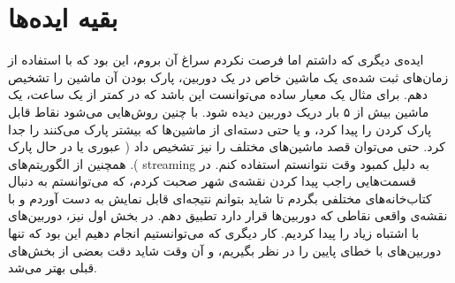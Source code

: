 \section{بقیه ایده‌ها}

ایده‌ی دیگری که داشتم اما فرصت نکردم سراغ آن بروم، این بود که با استفاده از زمان‌های ثبت شده‌ی یک ماشین خاص در یک دوربین، 
پارک بودن آن ماشین را تشخیص دهم. برای مثال یک معیار ساده می‌توانست این باشد که در کمتر از یک ساعت، یک ماشین بیش از ۵ بار دریک دوربین دیده شود. 
با چنین روش‌هایی می‌شود نقاط قابل پارک کردن را پیدا کرد، و یا حتی دسته‌ای از ماشین‌ها که بیشتر پارک می‌کنند را جدا کرد. حتی می‌توان قصد ماشین‌های مختلف را نیز تشخیص داد (
    عبوری یا در حال پارک
). همچنین از الگوریتم‌های 
streaming
به دلیل کمبود وقت نتوانستم استفاده کنم. در قسمت‌هایی راجب پیدا کردن نقشه‌ی شهر صحبت کردم، که می‌توانستم به دنبال کتاب‌خانه‌های مختلفی بگردم تا 
شاید بتوانم نتیجه‌ای قابل نمایش به دست آوردم و با نقشه‌ی واقعی نقاطی که دوربین‌ها قرار دارد تطبیق دهم. در بخش اول نیز، دوربین‌های با اشتباه زیاد را 
پیدا کردیم. کار دیگری که می‌توانستیم انجام دهیم این بود که تنها دوربین‌های با خطای پایین را در نظر بگیریم، و آن وقت شاید 
دقت بعضی از بخش‌های قبلی بهتر می‌شد. 